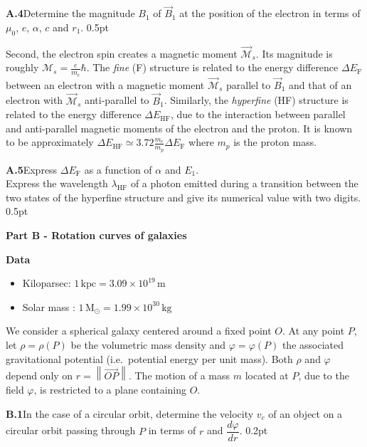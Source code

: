 \textbf{A.4}\quad Determine the magnitude $B_1$ of $\overrightarrow{B}_1$ at the
position of the electron in terms of $\mu_0$, $e$, $\alpha$, $c$ and $r_1$.
\hfill 0.5pt

Second, the electron spin creates a magnetic moment
$\overrightarrow{\mathcal{M}}_s$. Its magnitude is roughly
$\mathcal{M}_s = \frac{e}{m_e}\hbar$. The \textit{fine} (F) structure is related
to the energy difference $\varDelta E_\mathrm{F}$ between an electron with a
magnetic moment $\overrightarrow{\mathcal{M}}_s$ parallel to
$\overrightarrow{B}_1$ and that of an electron with
$\overrightarrow{\mathcal{M}}_s$ anti-parallel to $\overrightarrow{B}_1$.
Similarly, the \textit{hyperfine} (HF) structure is related to the energy
difference $\varDelta E_\mathrm{HF}$, due to the interaction between parallel
and anti-parallel magnetic moments of the electron and the proton. It is known
to be approximately
$\varDelta E_\mathrm{HF} \simeq 3.72\frac{m_e}{m_p}\varDelta E_\mathrm{F}$
where $m_p$ is the proton mass.

\textbf{A.5}\quad Express $\varDelta E_\mathrm{F}$ as a function of $\alpha$ and
$E_1$.\\
Express the wavelength $\lambda_\mathrm{HF}$ of a photon emitted during a
transition between the two states of the hyperfine structure and give its
numerical value with two digits. \hfill 0.5pt

\textbf{Part B - Rotation curves of galaxies}

\textbf{Data}
\begin{itemize}
\item Kiloparsec: $1\,\mathrm{kpc} = 3.09 \times 10^{19}\,\mathrm{m}$
\item Solar mass : $1\,\mathrm{M}_\odot = 1.99 \times 10^{30}\,\mathrm{kg}$
\end{itemize}

We consider a spherical galaxy centered around a fixed point $O$. At any point
$P$, let $\rho = \rho(P)$ be the volumetric mass density and
$\varphi = \varphi(P)$ the associated gravitational potential (i.e.\ potential
energy per unit mass). Both $\rho$ and $\varphi$ depend only on
$r = \left\|\overrightarrow{OP}\right\|$. The motion of a mass $m$ located at
$P$, due to the field $\varphi$, is restricted to a plane containing $O$.

\textbf{B.1}\quad In the case of a circular orbit, determine the velocity $v_c$
of an object on a circular orbit passing through $P$ in terms of $r$ and
$\dfrac{d\varphi}{dr}$. \hfill 0.2pt

